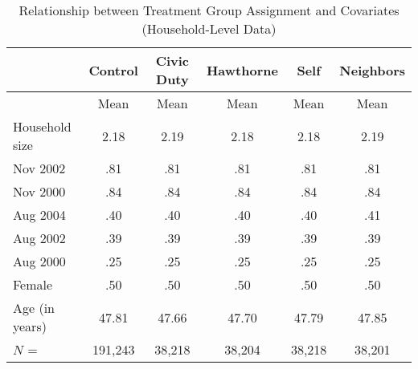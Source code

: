 \begin{table}[ht]
\centering
\caption{Relationship between Treatment Group Assignment and Covariates (Household-Level Data)}
\label{tab:household_balance}
\begin{tabular}{lccccc}
\toprule
 & Control & Civic Duty & Hawthorne & Self & Neighbors \\
\midrule
 & Mean & Mean & Mean & Mean & Mean \\
\midrule
Household size & 2.18 & 2.19 & 2.18 & 2.18 & 2.19 \\
Nov 2002 & .81 & .81 & .81 & .81 & .81 \\
Nov 2000 & .84 & .84 & .84 & .84 & .84 \\
Aug 2004 & .40 & .40 & .40 & .40 & .41 \\
Aug 2002 & .39 & .39 & .39 & .39 & .39 \\
Aug 2000 & .25 & .25 & .25 & .25 & .25 \\
Female & .50 & .50 & .50 & .50 & .50 \\
Age (in years) & 47.81 & 47.66 & 47.70 & 47.79 & 47.85 \\
\midrule
$N$ = & 191,243 & 38,218 & 38,204 & 38,218 & 38,201 \\
\bottomrule
\end{tabular}
\\
\begin{minipage}{0.95\textwidth}
\end{minipage}
\end{table}